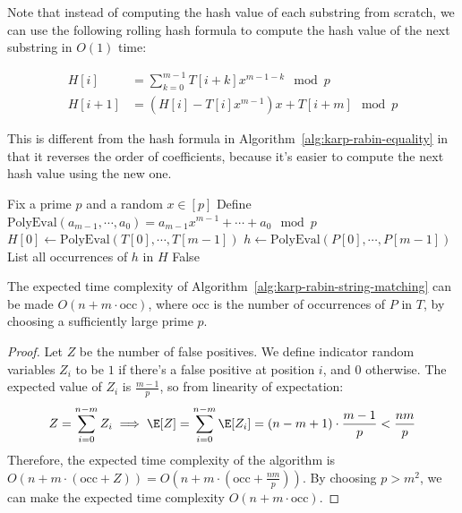 Note that instead of computing the hash value of each substring from scratch, we can use the following rolling hash formula to compute the hash value of the next substring in $O(1)$ time:

\begin{align*}
	H[i]   & = \sum_{k=0}^{m-1} T[i+k] x^{m-1-k} \mod p \\
	H[i+1] & = (H[i] - T[i] x^{m-1}) x + T[i+m] \mod p
\end{align*}

\begin{note}
	This is different from the hash formula in Algorithm~\ref{alg:karp-rabin-equality} in that it reverses the order of coefficients,	because it's easier to compute the next hash value using the new one.
\end{note}

\begin{algorithm}[H]
	Fix a prime $p$ and a random $x \in [p]$\;
	Define $\text{PolyEval} (a_{m-1},\cdots,a_0) = a_{m-1}x^{m-1} + \cdots + a_0 \mod p$\;
	$H[0] \gets \text{PolyEval} (T[0],\cdots,T[m-1])$\;
	$h \gets \text{PolyEval} (P[0],\cdots,P[m-1])$\;
	List all occurrences of $h$ in $H$\;
	\Return False\;
	\caption{Karp-Rabin Algorithm for String Matching} \label{alg:karp-rabin-string-matching}
\end{algorithm}

\begin{theorem}
	The expected time complexity of Algorithm~\ref{alg:karp-rabin-string-matching} can be made $O(n + m\cdot \text{occ})$, where $\text{occ}$ is the number of occurrences of $P$ in $T$, by choosing a sufficiently large prime $p$.
\end{theorem}
\begin{proof}
	Let $Z$ be the number of false positives. We define indicator random variables $Z_i$ to be $1$ if there's a false positive at position $i$, and $0$ otherwise. The expected value of $Z_i$ is $\frac{m-1}{p}$, so from linearity of expectation:
	\[
		Z = \sum_{i=0}^{n-m} Z_i \implies \E[Z] = \sum_{i=0}^{n-m} \E[Z_i] = (n-m+1) \cdot \frac{m-1}{p} < \frac{n m}{p}
	\]
	Therefore, the expected time complexity of the algorithm is $O(n + m\cdot (\text{occ} + Z)) = O(n + m\cdot (\text{occ} + \frac{n m}{p}))$. By choosing $p>m^2$, we can make the expected time complexity $O(n + m\cdot \text{occ})$.
\end{proof}

